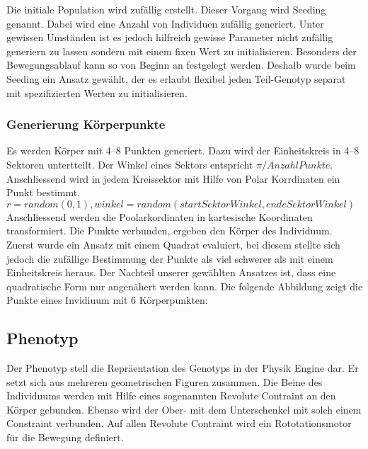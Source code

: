           Die initiale Population wird zufällig erstellt. Dieser Vorgang wird Seeding genannt.
          Dabei wird eine Anzahl von Individuen zufällig generiert.
          Unter gewissen Umständen ist es jedoch hilfreich gewisse Parameter nicht zufällig generiern zu lassen
          sondern mit einem fixen Wert zu initialisieren.
          Besonders der Bewegungsablauf kann so von Beginn an festgelegt werden.
          Deshalb wurde beim Seeding ein Ansatz gewählt, der es erlaubt flexibel jeden Teil-Genotyp separat mit
          spezifizierten Werten zu initialisieren.

      \subsubsection{Generierung Körperpunkte\label{subsub:GenotypGenerierungKörperpunkte}}
        Es werden Körper mit 4--8 Punkten generiert. Dazu wird der Einheitskreis in 4--8 Sektoren untertteilt.
        Der Winkel eines Sektors entspricht \(\pi / Anzahl Punkte\). \\
        Anschliessend wird in jedem Kreissektor mit Hilfe von Polar Korrdinaten ein Punkt bestimmt. \\
        \( r = random (0, 1), winkel = random(startSektorWinkel, endeSektorWinkel ) \)
        Anschliessend werden die Poolarkordinaten in kartesische Koordinaten transformiert.
        Die Punkte verbunden, ergeben den Körper des Individuum. \\
        Zuerst wurde ein Ansatz mit einem Quadrat evaluiert, bei diesem stellte sich jedoch die zufällige Bestimmung
        der Punkte als viel schwerer als mit einem Einheitskreis heraus. Der Nachteil unserer gewählten
        Ansatzes ist, dass eine quadratische Form nur angenähert werden kann.
        Die folgende Abbildung zeigt die Punkte eines Invidiuum mit 6 Körperpunkten: \\

        


  \subsection{Phenotyp\label{sub:Phenotyp}}
    Der Phenotyp stell die Repräentation des Genotyps in der Physik Engine dar.
    Er setzt sich aus mehreren geometrischen Figuren zusammen. Die Beine des Individuums
    werden mit Hilfe eines sogenannten Revolute Contraint an den Körper gebunden.
    Ebenso wird der Ober- mit dem Unterschenkel mit solch einem Constraint verbunden.
    Auf allen Revolute Contraint wird ein Rototationsmotor für die Bewegung definiert.

